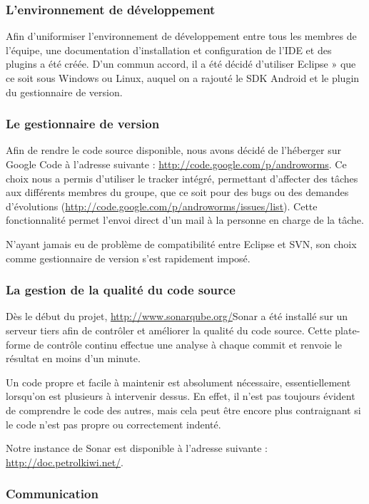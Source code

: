 \documentclass{report}
\begin{document}
\subsubsection{L'environnement de développement}
Afin d’uniformiser l’environnement de développement entre tous les
membres de l’équipe, une documentation d’installation et configuration
de l’IDE et des plugins a été créée.
D’un commun accord, il a été décidé d’utiliser Eclipse » que ce soit
sous Windows ou Linux, auquel on a rajouté le SDK Android et le plugin
du gestionnaire de version.

\subsubsection{Le gestionnaire de version}

Afin de rendre le code source disponible, nous avons décidé de
l’héberger sur Google Code à l’adresse suivante :
\url{http://code.google.com/p/androworms}.
Ce choix nous a permis d’utiliser le tracker intégré, permettant
d’affecter des tâches aux différents membres du groupe, que ce soit pour
des bugs ou des demandes d’évolutions
(\url{http://code.google.com/p/androworms/issues/list}). Cette
fonctionnalité permet l’envoi direct d’un mail à la personne en charge
de la tâche.

N’ayant jamais eu de problème de compatibilité entre Eclipse et SVN,
son choix comme gestionnaire de version s’est rapidement imposé.

\subsubsection{La gestion de la qualité du code source}

Dès le début du projet, \url{http://www.sonarqube.org/}{Sonar} a été
installé sur un serveur tiers afin de contrôler et améliorer la qualité
du code source.
Cette plate-forme de contrôle continu effectue une analyse à chaque
commit et renvoie le résultat en moins d’un minute.

Un code propre et facile à maintenir est absolument nécessaire,
essentiellement lorsqu’on est plusieurs à intervenir dessus. En effet,
il n’est pas toujours évident de comprendre le code des autres, mais
cela peut être encore plus contraignant si le code n’est pas propre ou
correctement indenté.

Notre instance de Sonar est disponible à l’adresse suivante :
\url{http://doc.petrolkiwi.net/}.

\subsubsection{Communication}
\end{document}
